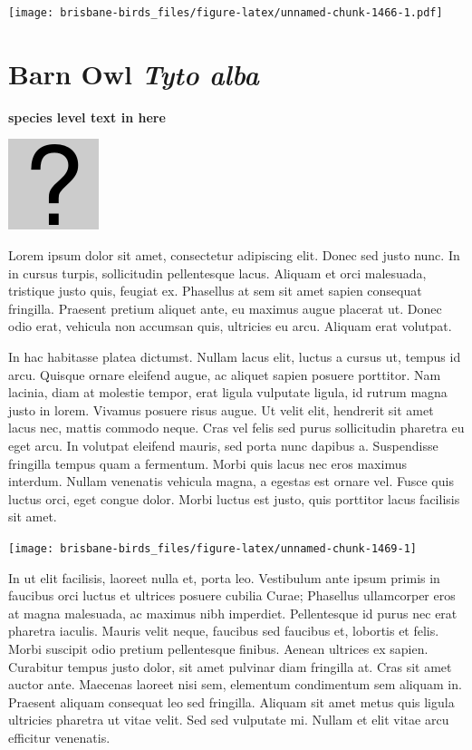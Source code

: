 \documentclass[]{book}
\let\origfigure\figure
\let\endorigfigure\endfigure
\renewenvironment{figure}[1][2] {
  \expandafter\origfigure\expandafter[H]
} {
  \endorigfigure
}
\begin{document}
\texttt{[image: brisbane-birds\_files/figure-latex/unnamed-chunk-1466-1.pdf]}

\section{\texorpdfstring{Barn Owl \emph{Tyto
alba}}{Barn Owl Tyto alba}}\label{barn-owl-tyto-alba}

\textbf{species level text in here}

\begin{figure}
\centering
\includegraphics{assets/missing.png}
\caption{No image for species}
\end{figure}

Lorem ipsum dolor sit amet, consectetur adipiscing elit. Donec sed justo
nunc. In in cursus turpis, sollicitudin pellentesque lacus. Aliquam et
orci malesuada, tristique justo quis, feugiat ex. Phasellus at sem sit
amet sapien consequat fringilla. Praesent pretium aliquet ante, eu
maximus augue placerat ut. Donec odio erat, vehicula non accumsan quis,
ultricies eu arcu. Aliquam erat volutpat.

In hac habitasse platea dictumst. Nullam lacus elit, luctus a cursus ut,
tempus id arcu. Quisque ornare eleifend augue, ac aliquet sapien posuere
porttitor. Nam lacinia, diam at molestie tempor, erat ligula vulputate
ligula, id rutrum magna justo in lorem. Vivamus posuere risus augue. Ut
velit elit, hendrerit sit amet lacus nec, mattis commodo neque. Cras vel
felis sed purus sollicitudin pharetra eu eget arcu. In volutpat eleifend
mauris, sed porta nunc dapibus a. Suspendisse fringilla tempus quam a
fermentum. Morbi quis lacus nec eros maximus interdum. Nullam venenatis
vehicula magna, a egestas est ornare vel. Fusce quis luctus orci, eget
congue dolor. Morbi luctus est justo, quis porttitor lacus facilisis sit
amet.

\begin{figure}
\texttt{[image: brisbane-birds\_files/figure-latex/unnamed-chunk-1469-1]} \caption{insert figure caption}\label{fig:unnamed-chunk-1469}
\end{figure}

In ut elit facilisis, laoreet nulla et, porta leo. Vestibulum ante ipsum
primis in faucibus orci luctus et ultrices posuere cubilia Curae;
Phasellus ullamcorper eros at magna malesuada, ac maximus nibh
imperdiet. Pellentesque id purus nec erat pharetra iaculis. Mauris velit
neque, faucibus sed faucibus et, lobortis et felis. Morbi suscipit odio
pretium pellentesque finibus. Aenean ultrices ex sapien. Curabitur
tempus justo dolor, sit amet pulvinar diam fringilla at. Cras sit amet
auctor ante. Maecenas laoreet nisi sem, elementum condimentum sem
aliquam in. Praesent aliquam consequat leo sed fringilla. Aliquam sit
amet metus quis ligula ultricies pharetra ut vitae velit. Sed sed
vulputate mi. Nullam et elit vitae arcu efficitur venenatis.
\end{document}
